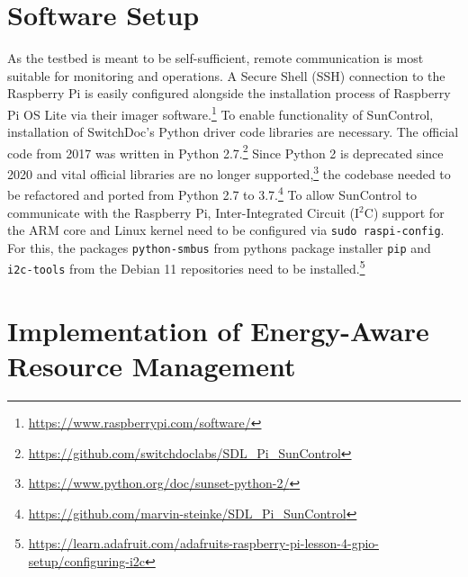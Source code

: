 \section{Software Setup}
\label{sec:software_setup}

As the testbed is meant to be self-sufficient, remote communication is most
suitable for monitoring and operations. A Secure Shell (SSH) connection to the
Raspberry Pi is easily configured alongside the installation process of
Raspberry Pi OS Lite via their imager
software.\footnote{\url{https://www.raspberrypi.com/software/}} To enable
functionality of SunControl, installation of SwitchDoc's Python driver code
libraries are necessary. The official code from 2017 was written in Python
2.7.\footnote{\url{https://github.com/switchdoclabs/SDL_Pi_SunControl}} Since
Python 2 is deprecated since 2020 and vital official libraries are no longer
supported,\footnote{\url{https://www.python.org/doc/sunset-python-2/}} the
codebase needed to be refactored and ported from Python 2.7 to
3.7.\footnote{\url{https://github.com/marvin-steinke/SDL_Pi_SunControl}} To
allow SunControl to communicate with the Raspberry Pi, Inter-Integrated Circuit
(I$^2$C) support for the ARM core and Linux kernel need to be configured via
\texttt{sudo raspi-config}. For this, the packages \texttt{python-smbus} from
pythons package installer \texttt{pip} and \texttt{i2c-tools} from the Debian 11
repositories need to be
installed.\footnote{\url{https://learn.adafruit.com/adafruits-raspberry-pi-lesson-4-gpio-setup/configuring-i2c}}


\section{Implementation of Energy-Aware Resource Management}
\label{sec:implementation_of_energy-aware_resource_management}

